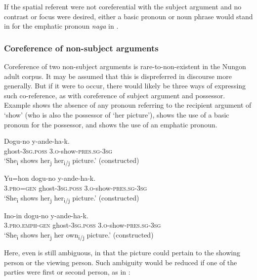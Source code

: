 \documentclass[output=paper,colorlinks,citecolor=brown]{langscibook}
\begin{document}
If the spatial referent were not coreferential with the subject argument and no contrast or focus were desired, either a basic pronoun or noun phrase would stand in for the emphatic pronoun \textit{naga} in .

\subsubsection{Coreference of non-subject arguments}\label{sec:sarvasy:3.3.3}

Coreference of two non-subject arguments is rare-to-non-existent in the Nungon adult corpus. It may be assumed that this is dispreferred in discourse more generally. But if it were to occur, there would likely be three ways of expressing such co-reference, as with coreference of subject argument and possessor. Example  shows the absence of any pronoun referring to the recipient argument of ‘show’ (who is also the possessor of ‘her picture’),  shows the use of a basic pronoun for the possessor, and  shows the use of an emphatic pronoun.     

\ea%
    \label{ex:sarvasy:24}
    \gll    Dogu-no   y-ande-ha-k.\\
            ghost-\textsc{3sg.poss}  \textsc{3.o-}show-\textsc{pres.sg-3sg}\\
    \glt    ‘She\textsubscript{i} shows her\textsubscript{j} her\textsubscript{i/j} picture.’ (constructed)
\z

\ea%
    \label{ex:sarvasy:25}
    \gll    Yu=hon  dogu-no   y-ande-ha-k.\\
            \textsc{3.pro=gen}  ghost-\textsc{3sg.poss}  \textsc{3.o-}show-\textsc{pres.sg-3sg}\\
    \glt    ‘She\textsubscript{i} shows her\textsubscript{j} her\textsubscript{i/j} picture.’ (constructed)
\z

\ea%
    \label{ex:sarvasy:26}
    \gll    Ino-in      dogu-no   y-ande-ha-k.\\
            \textsc{3.pro.emph-gen}  ghost\textsc{{}-3sg.poss  3.o-}show\textsc{{}-pres.sg-3sg}\\
    \glt    ‘She\textsubscript{i} shows her\textsubscript{j} her own\textsubscript{i/j} picture.’ (constructed)
\z

Here, even  is still ambiguous, in that the picture could pertain to the showing person or the viewing person. Such ambiguity would be reduced if one of the parties were first or second person, as in :
\end{document}
